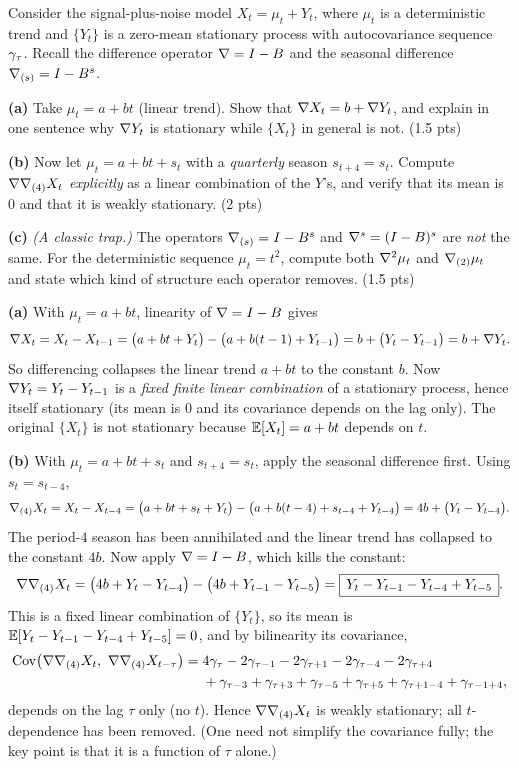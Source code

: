 \documentclass[11pt]{article}
\begin{document}

\statementstart
Consider the signal-plus-noise model $X_t=\mu_t+Y_t$, where $\mu_t$ is a deterministic trend and $\{Y_t\}$ is a zero-mean stationary process with autocovariance sequence $\gamma_\tau$. Recall the difference operator $\nabla=I-B$ and the seasonal difference $\nabla_{(s)}=I-B^{s}$.

\textbf{(a)} Take $\mu_t=a+bt$ (linear trend). Show that $\nabla X_t=b+\nabla Y_t$, and explain in one sentence why $\nabla Y_t$ is stationary while $\{X_t\}$ in general is not. \hfill(1.5 pts)

\textbf{(b)} Now let $\mu_t=a+bt+s_t$ with a \emph{quarterly} season $s_{t+4}=s_t$. Compute $\nabla\nabla_{(4)}X_t$ \emph{explicitly} as a linear combination of the $Y$'s, and verify that its mean is $0$ and that it is weakly stationary. \hfill(2 pts)

\textbf{(c)} \emph{(A classic trap.)} The operators $\nabla_{(s)}=I-B^{s}$ and $\nabla^{s}=(I-B)^{s}$ are \emph{not} the same. For the deterministic sequence $\mu_t=t^{2}$, compute both $\nabla^{2}\mu_t$ and $\nabla_{(2)}\mu_t$ and state which kind of structure each operator removes. \hfill(1.5 pts)
\statementend

\textbf{(a)} With $\mu_t=a+bt$, linearity of $\nabla=I-B$ gives
\[
\nabla X_t=X_t-X_{t-1}
=\bigl(a+bt+Y_t\bigr)-\bigl(a+b(t-1)+Y_{t-1}\bigr)
=b+\bigl(Y_t-Y_{t-1}\bigr)=b+\nabla Y_t .
\]
So differencing collapses the linear trend $a+bt$ to the constant $b$. Now $\nabla Y_t=Y_t-Y_{t-1}$ is a \emph{fixed finite linear combination} of a stationary process, hence itself stationary (its mean is $0$ and its covariance depends on the lag only). The original $\{X_t\}$ is not stationary because $\mathbb{E}[X_t]=a+bt$ depends on $t$.

\textbf{(b)} With $\mu_t=a+bt+s_t$ and $s_{t+4}=s_t$, apply the seasonal difference first. Using $s_t=s_{t-4}$,
\[
\nabla_{(4)}X_t=X_t-X_{t-4}
=\bigl(a+bt+s_t+Y_t\bigr)-\bigl(a+b(t-4)+s_{t-4}+Y_{t-4}\bigr)
=4b+\bigl(Y_t-Y_{t-4}\bigr).
\]
The period-$4$ season has been annihilated and the linear trend has collapsed to the constant $4b$. Now apply $\nabla=I-B$, which kills the constant:
\[
\nabla\nabla_{(4)}X_t
=\bigl(4b+Y_t-Y_{t-4}\bigr)-\bigl(4b+Y_{t-1}-Y_{t-5}\bigr)
=\boxed{\,Y_t-Y_{t-1}-Y_{t-4}+Y_{t-5}\,}.
\]
This is a fixed linear combination of $\{Y_t\}$, so its mean is $\mathbb{E}[Y_t-Y_{t-1}-Y_{t-4}+Y_{t-5}]=0$, and by bilinearity its covariance,
\[
\begin{aligned}
\operatorname{Cov}\bigl(\nabla\nabla_{(4)}X_t,\ \nabla\nabla_{(4)}X_{t-\tau}\bigr)
=\;&4\gamma_\tau
-2\gamma_{\tau-1}-2\gamma_{\tau+1}
-2\gamma_{\tau-4}-2\gamma_{\tau+4}\\
&+\gamma_{\tau-3}+\gamma_{\tau+3}
+\gamma_{\tau-5}+\gamma_{\tau+5}
+\gamma_{\tau+1-4}+\gamma_{\tau-1+4},
\end{aligned}
\]
depends on the lag $\tau$ only (no $t$). Hence $\nabla\nabla_{(4)}X_t$ is weakly stationary; all $t$-dependence has been removed. (One need not simplify the covariance fully; the key point is that it is a function of $\tau$ alone.)
\end{document}
